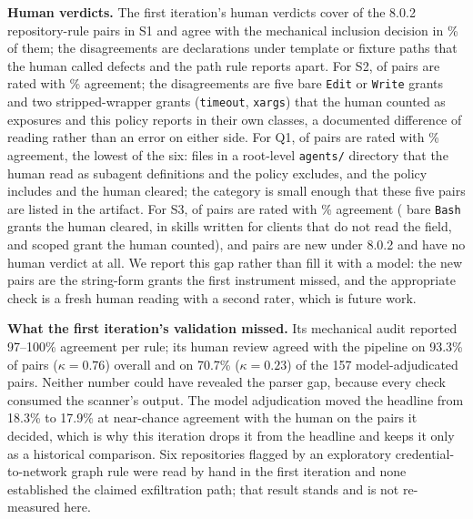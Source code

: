 \documentclass[10pt,conference]{IEEEtran}
\newcommand{\vnew}{8.0.2}
\newcommand{\pct}[1]{#1\%}
\begin{document}
\textbf{Human verdicts.} The first iteration's \HumanTotalVerdicts{} human verdicts cover \HumanSOneWithHumanVerdict{} of the \HumanSOnePairsNew{} \vnew{} repository-rule pairs in S1 and agree with the mechanical inclusion decision in \pct{\HumanSOneAgreePct} of them; the \HumanSOneHumanYesButExcluded{} disagreements are declarations under template or fixture paths that the human called defects and the path rule reports apart. For S2, \HumanSTwoWithHumanVerdict{} of \HumanSTwoPairsNew{} pairs are rated with \pct{\HumanSTwoAgreePct} agreement; the \HumanSTwoHumanYesButExcluded{} disagreements are five bare \texttt{Edit} or \texttt{Write} grants and two stripped-wrapper grants (\texttt{timeout}, \texttt{xargs}) that the human counted as exposures and this policy reports in their own classes, a documented difference of reading rather than an error on either side. For Q1, \HumanQOneWithHumanVerdict{} of \HumanQOnePairsNew{} pairs are rated with \pct{\HumanQOneAgreePct} agreement, the lowest of the six: \HumanQOneHumanYesButExcluded{} files in a root-level \texttt{agents/} directory that the human read as subagent definitions and the policy excludes, and \HumanQOneHumanNoButIncluded{} the policy includes and the human cleared; the category is small enough that these five pairs are listed in the artifact. For S3, \HumanSThreeWithHumanVerdict{} of \HumanSThreePairsNew{} pairs are rated with \pct{\HumanSThreeAgreePct} agreement (\HumanSThreeHumanNoButIncluded{} bare \texttt{Bash} grants the human cleared, in skills written for clients that do not read the field, and \HumanSThreeHumanYesButExcluded{} scoped grant the human counted), and \HumanSThreeNewPairsWithoutVerdict{} pairs are new under \vnew{} and have no human verdict at all. We report this gap rather than fill it with a model: the new pairs are the string-form grants the first instrument missed, and the appropriate check is a fresh human reading with a second rater, which is future work.

\textbf{What the first iteration's validation missed.} Its mechanical audit reported 97--100\% agreement per rule; its human review agreed with the pipeline on 93.3\% of pairs ($\kappa=0.76$) overall and on 70.7\% ($\kappa=0.23$) of the 157 model-adjudicated pairs. Neither number could have revealed the parser gap, because every check consumed the scanner's output. The model adjudication moved the headline from 18.3\% to 17.9\% at near-chance agreement with the human on the pairs it decided, which is why this iteration drops it from the headline and keeps it only as a historical comparison. Six repositories flagged by an exploratory credential-to-network graph rule were read by hand in the first iteration and none established the claimed exfiltration path; that result stands and is not re-measured here.
\end{document}
